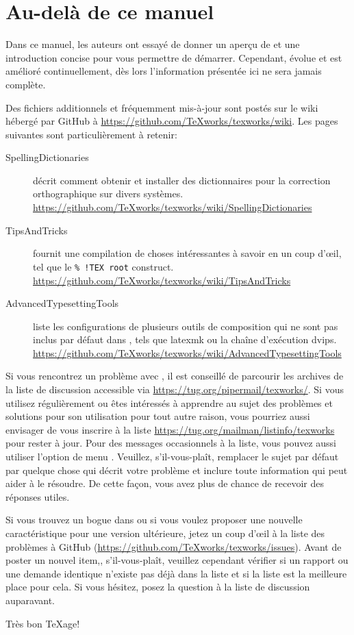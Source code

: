 
\chapter{Au-del{\`a} de ce manuel}

Dans ce manuel, les auteurs ont essayé de donner un aperçu de \Tw{} et une introduction concise pour vous permettre de démarrer. Cependant, \Tw{} évolue et est amélioré continuellement, dès lors l'information présentée ici ne sera jamais complète.

Des fichiers additionnels et fréquemment mis-à-jour sont postés sur le wiki hébergé par GitHub à \url{https://github.com/TeXworks/texworks/wiki}. Les pages suivantes sont particulièrement à retenir:
\begin{description}
\item[SpellingDictionaries] décrit comment obtenir et installer des dictionnaires pour la correction orthographique sur divers systèmes. \url{https://github.com/TeXworks/texworks/wiki/SpellingDictionaries}
\item[TipsAndTricks] fournit une compilation de choses intéressantes à savoir en un coup d'œil, tel que le \verb|% !TEX root| construct. \url{https://github.com/TeXworks/texworks/wiki/TipsAndTricks}
\item[AdvancedTypesettingTools] liste les configurations de plusieurs outils de composition qui ne sont pas inclus par défaut dans \Tw, tels que latexmk ou la chaîne d'exécution dvips. \url{https://github.com/TeXworks/texworks/wiki/AdvancedTypesettingTools}
\end{description}

Si vous rencontrez un problème avec \Tw, il est conseillé de parcourir les archives de la liste de discussion accessible via \url{https://tug.org/pipermail/texworks/}. Si vous utilisez \Tw{} régulièrement ou êtes intéressés à apprendre au sujet des problèmes et solutions pour son utilisation pour tout autre raison, vous pourriez aussi envisager de vous inscrire à la liste \url{https://tug.org/mailman/listinfo/texworks} pour rester à jour. Pour des messages occasionnels à la liste, vous pouvez aussi utiliser l'option de menu \submenu{}. Veuillez, s'il-vous-plaît, remplacer le sujet par défaut par quelque chose qui décrit votre problème et inclure toute information qui peut aider à le résoudre. De cette façon, vous avez plus de chance de recevoir des réponses utiles.

Si vous trouvez un bogue dans \Tw{} ou si vous voulez proposer une nouvelle caractéristique pour une version ultérieure, jetez un coup d'œil à la liste des problèmes à GitHub (\url{https://github.com/TeXworks/texworks/issues}). Avant de poster un nouvel item,, s'il-vous-plaît, veuillez cependant vérifier si un rapport ou une demande identique n'existe pas déjà dans la liste et si la liste est la meilleure place pour cela. Si vous hésitez, posez la question à la liste de discussion auparavant.

Très bon \TeX{}age!
